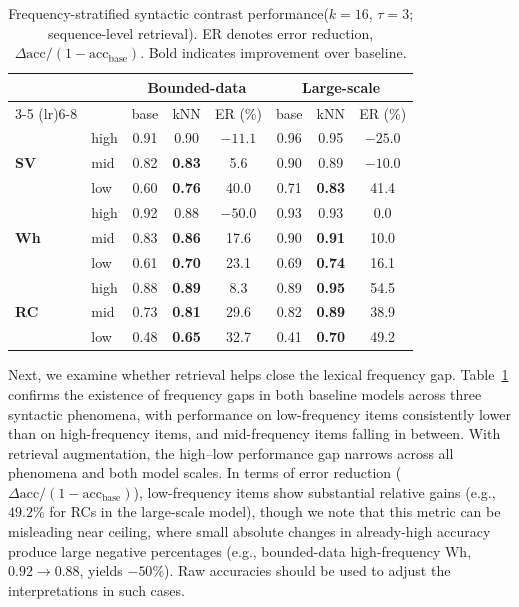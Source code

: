 \begin{table}[htbp]
\centering
\caption{Frequency-stratified syntactic contrast performance($k=16$, $\tau=3$; sequence-level retrieval). ER denotes error reduction,
$\Delta\mathrm{acc}/(1-\mathrm{acc}_{\mathrm{base}})$. Bold indicates improvement over baseline.}
\vspace{6pt}
\label{tab:frequency_effects}
\small
\setlength{\tabcolsep}{4pt}
\renewcommand{\arraystretch}{0.96}
\begin{tabular}{@{}llcccccc@{}}
\toprule
& & \multicolumn{3}{c}{\textbf{Bounded-data}} &
    \multicolumn{3}{c}{\textbf{Large-scale}} \\
\cmidrule(lr){3-5} \cmidrule(lr){6-8}
& & base & kNN & ER (\%) & base & kNN & ER (\%) \\
\midrule
\multirow{3}{*}{\textbf{SV}}
& high & 0.91 & 0.90 & $-11.1$ & 0.96 & 0.95 & $-25.0$ \\
& mid  & 0.82 & \textbf{0.83} & 5.6
       & 0.90 & 0.89 & $-10.0$ \\
& low  & 0.60 & \textbf{0.76} & 40.0
       & 0.71 & \textbf{0.83} & 41.4 \\
\midrule
\multirow{3}{*}{\textbf{Wh}}
& high & 0.92 & 0.88 & $-50.0$ & 0.93 & 0.93 & 0.0 \\
& mid  & 0.83 & \textbf{0.86} & 17.6
       & 0.90 & \textbf{0.91} & 10.0 \\
& low  & 0.61 & \textbf{0.70} & 23.1
       & 0.69 & \textbf{0.74} & 16.1 \\
\midrule
\multirow{3}{*}{\textbf{RC}}
& high & 0.88 & \textbf{0.89} & 8.3
       & 0.89 & \textbf{0.95} & 54.5 \\
& mid  & 0.73 & \textbf{0.81} & 29.6
       & 0.82 & \textbf{0.89} & 38.9 \\
& low  & 0.48 & \textbf{0.65} & 32.7
       & 0.41 & \textbf{0.70} & 49.2 \\
\bottomrule
\end{tabular}
\end{table}

Next, we examine whether retrieval helps close the lexical frequency gap. Table~\ref{tab:frequency_effects} confirms the existence of frequency gaps in both baseline models across three syntactic phenomena, with performance on low-frequency items consistently lower than on high-frequency items, and mid-frequency items falling in between. With retrieval augmentation, the high--low performance gap narrows across all phenomena and both model scales. In terms of error reduction ($\Delta\text{acc}/(1-\text{acc}_{\text{base}})$), low-frequency items show substantial relative gains (e.g., $49.2\%$ for RCs in the large-scale model), though we note that this metric can be misleading near ceiling, where small absolute changes in already-high accuracy produce large negative percentages (e.g., bounded-data high-frequency Wh, $0.92 \rightarrow 0.88$, yields $-50\%$). Raw accuracies should be used to adjust the interpretations in such cases.

